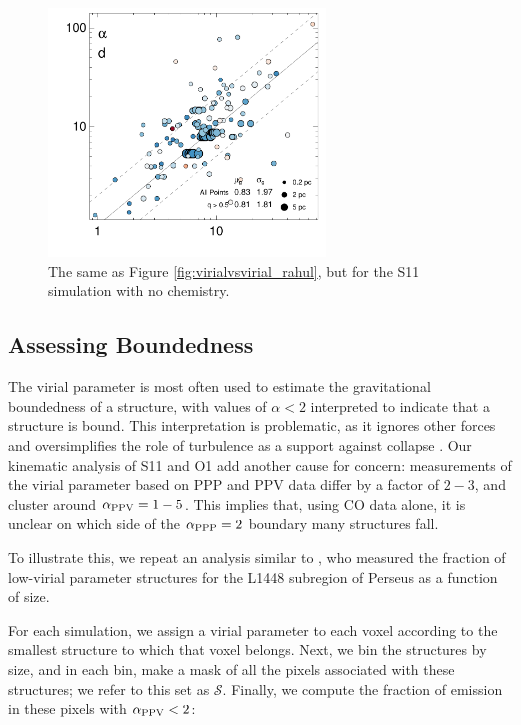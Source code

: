 \begin{figure}[htbp]
\includegraphics[width=2.9in]{figures/virial_rahul_nochem_13co}
\caption{The same as Figure \ref{fig:virialvsvirial_rahul}, but for the S11 simulation with no chemistry.}
\label{fig:virialvsvirial_nochem}
\end{figure}

\subsection{Assessing Boundedness}

The virial parameter is most often used to estimate the gravitational boundedness of a structure, with values of $\alpha < 2$ interpreted to indicate that a structure is bound. This interpretation is problematic, as it ignores other forces and oversimplifies the role of turbulence as a support against collapse \citep{http://adsabs.harvard.edu/abs/1992ApJ...395..140B, http://adsabs.harvard.edu/abs/2006MNRAS.372..443B}. Our kinematic analysis of S11 and O1 add another cause for concern: measurements of the virial parameter based on PPP and PPV data differ by a factor of $2-3$, and cluster around $\alpha_{\rm PPV} = 1-5$. This implies that, using CO data alone, it is unclear on which side of the $\alpha_{\rm PPP} = 2$ boundary many structures fall.

To illustrate this, we repeat an analysis similar to \cite{http://adsabs.harvard.edu/abs/2009Natur.457...63G}, who
measured the fraction of low-virial parameter structures for the L1448 subregion of Perseus as a function of size.

For each simulation, we assign a virial parameter to each voxel according to the smallest structure to which that voxel belongs. Next, we bin the structures by size, and in each bin, make a mask of all the pixels associated with these structures; we refer to this set as $\mathcal{S}$. Finally, we compute the fraction of emission in these pixels with $\alpha_{\rm PPV} < 2$:


